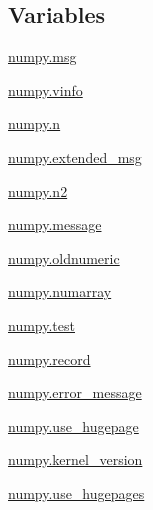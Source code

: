 \subsection*{Variables}
\begin{DoxyCompactItemize}
\item 
\hyperlink{namespacenumpy_ab96122eb8e44294b488b0ef93ec27d38}{numpy.\+msg}
\item 
\hyperlink{namespacenumpy_ad57cc1f157391df7570bccf725ba5abf}{numpy.\+vinfo}
\item 
\hyperlink{namespacenumpy_a352663c52853d2754274407d5cae2832}{numpy.\+n}
\item 
\hyperlink{namespacenumpy_a212925a5ecfb70237012aaee36a44789}{numpy.\+extended\+\_\+msg}
\item 
\hyperlink{namespacenumpy_a59b0d7baee040fdd1da26565c4ca2408}{numpy.\+n2}
\item 
\hyperlink{namespacenumpy_a2222f7c2b3c819deee274f05ccc2a705}{numpy.\+message}
\item 
\hyperlink{namespacenumpy_a8dc6952b5a0171808a2f920142d8403e}{numpy.\+oldnumeric}
\item 
\hyperlink{namespacenumpy_a91810bdd8fe09a74518e2b6f6efc0645}{numpy.\+numarray}
\item 
\hyperlink{namespacenumpy_a940b21ea81a40752b492a99b786f0718}{numpy.\+test}
\item 
\hyperlink{namespacenumpy_a26b7b29ce31118456a3c197e73d945bc}{numpy.\+record}
\item 
\hyperlink{namespacenumpy_ad70b9a8ab78be689bf073dc3a65b1096}{numpy.\+error\+\_\+message}
\item 
\hyperlink{namespacenumpy_ac2b03242e859c2749c9ab46cb321221c}{numpy.\+use\+\_\+hugepage}
\item 
\hyperlink{namespacenumpy_aaf7d214394ee08d6424d0b598a590ac7}{numpy.\+kernel\+\_\+version}
\item 
\hyperlink{namespacenumpy_a00cdcc15f38e00325dc285f9f4f275c8}{numpy.\+use\+\_\+hugepages}
\end{DoxyCompactItemize}
